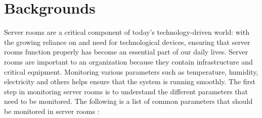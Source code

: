 
\section{Backgrounds}
    Server rooms are a critical component of today's technology-driven world: with the growing reliance on and need for technological devices, ensuring that server rooms function properly has become an essential part of our daily lives. Server rooms are important to an organization because they contain infrastructure and critical equipment. Monitoring various parameters such as temperature, humidity, electricity and others helps ensure that the system is running smoothly. The first step in monitoring server rooms is to understand the different parameters that need to be monitored. The following is a list of common parameters that should be monitored in server rooms :\\
